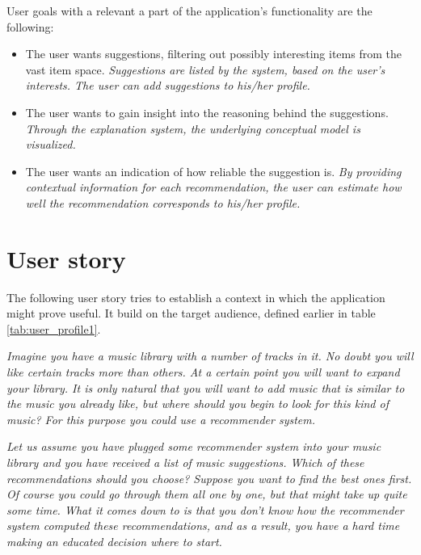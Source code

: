 User goals with a relevant a part of the application's functionality are the following:

\begin{itemize}
	\item The user wants suggestions, filtering out possibly interesting items from the vast item space. \textit{Suggestions are listed by the system, based on the user's interests. The user can add suggestions to his/her profile.}
	\item The user wants to gain insight into the reasoning behind the suggestions. \textit{Through the explanation system, the underlying conceptual model is visualized.}
	\item The user wants an indication of how reliable the suggestion is. \textit{By providing contextual information for each recommendation, the user can estimate how well the recommendation corresponds to his/her profile.}
\end{itemize}




\section{User story}

The following user story tries to establish a context in which the application might prove useful. It build on the target audience, defined earlier in table \ref{tab:user_profile1}.

\textit{Imagine you have a music library with a number of tracks in it. No doubt you will like certain tracks more than others. At a certain point you will want to expand your library. It is only natural that you will want to add music that is similar to the music you already like, but where should you begin to look for this kind of music? For this purpose you could use a recommender system.}

\textit{Let us assume you have plugged some recommender system into your music library and you have received a list of music suggestions. Which of these recommendations should you choose? Suppose you want to find the best ones first. Of course you could go through them all one by one, but that might take up quite some time. What it comes down to is that you don't know how the recommender system computed these recommendations, and as a result, you have a hard time making an educated decision where to start.}

